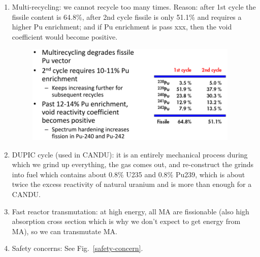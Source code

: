 \documentclass{school-22.211-notes}
\begin{document}
\begin{enumerate}
\item Multi-recycling: we cannot recycle too many times. Reason: after
  1st cycle the fissile content is 64.8\%, after 2nd cycle fissile is
  only 51.1\% and requires a higher Pu enrichment; and if Pu
  enrichment is pass xxx, then the void coefficient would become
  positive.
  \begin{figure}[h]
    \centering
    \includegraphics[width=4in]{images/dfs/multirecycling.png}
  \end{figure}

\item DUPIC cycle (used in CANDU): it is an entirely mechanical
  process during which we grind up everything, the gas comes out, and
  re-construct the grinds into fuel which contains about 0.8\% U235
  and 0.8\% Pu239, which is about twice the excess reactivity of
  natural uranium and is more than enough for a CANDU.

\item Fast reactor transmutation: at high energy, all MA are fissionable
  (also high absorption cross section which is why we don't expect to
  get energy from MA), so we can transmutate MA.

\item Safety concerns: See Fig.~\ref{safety-concern}.
 

\end{enumerate}
\end{document}
